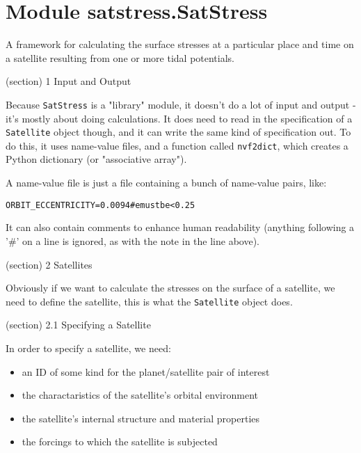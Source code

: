 %
%
%


\section{Module satstress.SatStress}

    \label{satstress:SatStress}
A framework for calculating the surface stresses at a particular place and 
time on a satellite resulting from one or more tidal potentials.

(section) 1 Input and Output

  Because \texttt{SatStress} is a "library" module, it doesn't do a lot of 
  input and output - it's mostly about doing calculations.  It does need to
  read in the specification of a \texttt{Satellite} object though, and it 
  can write the same kind of specification out.  To do this, it uses 
  name-value files, and a function called \texttt{nvf2dict}, which creates 
  a Python dictionary (or "associative array").

  A name-value file is just a file containing a bunch of name-value pairs, 
  like:

\begin{alltt}
 ORBIT\_ECCENTRICITY = 0.0094   \# e must be {\textless} 0.25\end{alltt}

  It can also contain comments to enhance human readability (anything 
  following a '\#' on a line is ignored, as with the note in the line 
  above).

(section) 2 Satellites

  Obviously if we want to calculate the stresses on the surface of a 
  satellite, we need to define the satellite, this is what the 
  \texttt{Satellite} object does.

  (section) 2.1 Specifying a Satellite

    In order to specify a satellite, we need:

    \begin{itemize}
    \setlength{\parskip}{0.6ex}
      \item an ID of some kind for the planet/satellite pair of interest

      \item the charactaristics of the satellite's orbital environment

      \item the satellite's internal structure and material properties

      \item the forcings to which the satellite is subjected

    \end{itemize}

